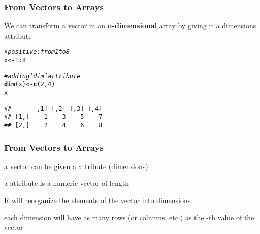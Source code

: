 \documentclass[12pt]{beamer}\usepackage[]{graphicx}\usepackage[]{color}
\makeatletter
\newcommand{\hlnum}[1]{\textcolor[rgb]{0.686,0.059,0.569}{#1}}%
\newcommand{\hlcom}[1]{\textcolor[rgb]{0.678,0.584,0.686}{\textit{#1}}}%
\newcommand{\hlopt}[1]{\textcolor[rgb]{0,0,0}{#1}}%
\newcommand{\hlstd}[1]{\textcolor[rgb]{0.345,0.345,0.345}{#1}}%
\newcommand{\hlkwb}[1]{\textcolor[rgb]{0.69,0.353,0.396}{#1}}%
\newcommand{\hlkwd}[1]{\textcolor[rgb]{0.737,0.353,0.396}{\textbf{#1}}}%
\newenvironment{kframe}{%
 \def\at@end@of@kframe{}%
 \ifinner\ifhmode%
  \def\at@end@of@kframe{\end{minipage}}%
  \begin{minipage}{\columnwidth}%
 \fi\fi%
 \def\FrameCommand##1{\hskip\@totalleftmargin \hskip-\fboxsep
 \colorbox{shadecolor}{##1}\hskip-\fboxsep
     \hskip-\linewidth \hskip-\@totalleftmargin \hskip\columnwidth}%
 \MakeFramed {\advance\hsize-\width
   \@totalleftmargin\z@ \linewidth\hsize
   \@setminipage}}%
 {\par\unskip\endMakeFramed%
 \at@end@of@kframe}
\newenvironment{knitrout}{}{} %
\makeatother
\begin{document}

\begin{frame}
\begin{center}
\Huge{}
\end{center}
\end{frame}


\begin{frame}[fragile]
\frametitle{From Vectors to Arrays}

We can transform a vector in an \textbf{n-dimensional} array by giving it a dimensions attribute 
\begin{knitrout}\footnotesize
{}\color{fgcolor}\begin{kframe}
\begin{alltt}
\hlcom{# positive: from 1 to 8}
\hlstd{x} \hlkwb{<-} \hlnum{1}\hlopt{:}\hlnum{8}

\hlcom{# adding 'dim' attribute}
\hlkwd{dim}\hlstd{(x)} \hlkwb{<-} \hlkwd{c}\hlstd{(}\hlnum{2}\hlstd{,} \hlnum{4}\hlstd{)}
\hlstd{x}
\end{alltt}
\begin{verbatim}
##      [,1] [,2] [,3] [,4]
## [1,]    1    3    5    7
## [2,]    2    4    6    8
\end{verbatim}
\end{kframe}
\end{knitrout}

\end{frame}


\begin{frame}[fragile]
\frametitle{From Vectors to Arrays}

\bbi
  \item a vector can be given a  attribute (dimensions)
  \item a  attribute is a numeric vector of length 
  \item R will reorganize the elements of the vector into  dimensions
  \item each dimension will have as many rows (or columns, etc.) as the -th value of the  vector
\ei

\end{frame}

\end{document}
